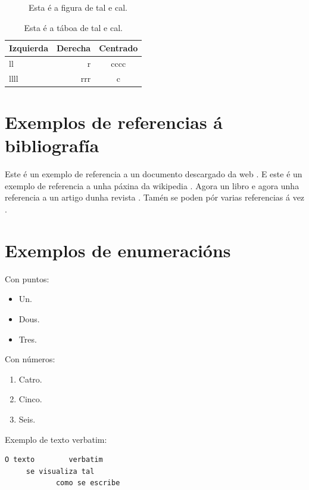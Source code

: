 \begin{figure}
\centerline{}
\caption{Esta é a figura de tal e cal.}
\label{enlace1}
\end{figure}

\begin{table}
\begin{center}
\begin{tabular}{|l||r|c|} \hline
Izquierda & Derecha & Centrado  \\ \hline\hline
ll & r & cccc \\ \hline
llll & rrr & c \\ \hline
\end{tabular}
\caption{Esta é a táboa de tal e cal.}
\label{enlace2}
\end{center}
\end{table}

\section{Exemplos de referencias á bibliografía}
Este é un exemplo de referencia a un documento descargado da web \cite{cuda}. E este é un exemplo de referencia a unha páxina da wikipedia \cite{cdma}. Agora un libro \cite{gonzalez} e agora unha referencia a un artigo dunha revista \cite{patricia}. Tamén se poden pór varias referencias á vez \cite{cuda,gonzalez}.

\section{Exemplos de enumeracións}

Con puntos:

\begin{itemize}
\item Un.
\item Dous.
\item Tres.
\end{itemize}

Con números:

\begin{enumerate}
\item Catro.
\item Cinco.
\item Seis.
\end{enumerate}

Exemplo de texto verbatim:

\begin{verbatim}
O texto        verbatim 
     se visualiza tal
            como se escribe
\end{verbatim}

